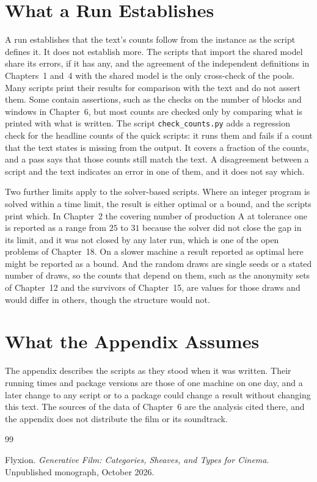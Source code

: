 \documentclass[11pt,twoside,openright]{book}
\theoremstyle{plain}
\theoremstyle{definition}
\theoremstyle{remark}
\begin{document}
\section{What a Run Establishes}\label{sec:establish}

A run establishes that the text's counts follow from the instance as the script defines it. It does not establish more. The scripts that import the shared model share its errors, if it has any, and the agreement of the independent definitions in Chapters~1 and~4 with the shared model is the only cross-check of the pools. Many scripts print their results for comparison with the text and do not assert them. Some contain assertions, such as the checks on the number of blocks and windows in Chapter~6, but most counts are checked only by comparing what is printed with what is written. The script \texttt{check\_counts.py} adds a regression check for the headline counts of the quick scripts: it runs them and fails if a count that the text states is missing from the output. It covers a fraction of the counts, and a pass says that those counts still match the text. A disagreement between a script and the text indicates an error in one of them, and it does not say which.

Two further limits apply to the solver-based scripts. Where an integer program is solved within a time limit, the result is either optimal or a bound, and the scripts print which. In Chapter~2 the covering number of production A at tolerance one is reported as a range from $25$ to $31$ because the solver did not close the gap in its limit, and it was not closed by any later run, which is one of the open problems of Chapter~18. On a slower machine a result reported as optimal here might be reported as a bound. And the random draws are single seeds or a stated number of draws, so the counts that depend on them, such as the anonymity sets of Chapter~12 and the survivors of Chapter~15, are values for those draws and would differ in others, though the structure would not.

\section{What the Appendix Assumes}\label{sec:limits-b}

The appendix describes the scripts as they stood when it was written. Their running times and package versions are those of one machine on one day, and a later change to any script or to a package could change a result without changing this text. The sources of the data of Chapter~6 are the analysis cited there, and the appendix does not distribute the film or its soundtrack.

\begin{thebibliography}{99}

Flyxion.
\newblock \emph{Generative Film: Categories, Sheaves, and Types for Cinema}.
\newblock Unpublished monograph, October 2026.

\end{thebibliography}
\end{document}

